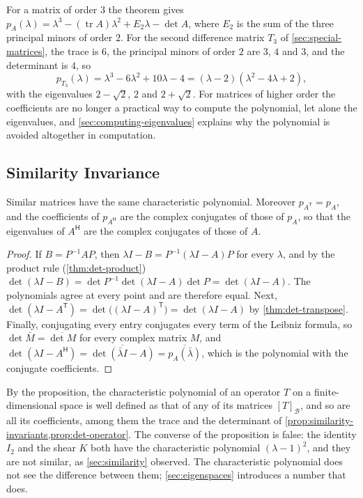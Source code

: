 For a matrix of order $3$ the theorem gives $p_A(\lambda)=\lambda^3-(\operatorname{tr}A)\lambda^2+E_2\lambda-\det A$, where $E_2$ is the sum of the three principal minors of order $2$. For the second difference matrix $T_3$ of \cref{sec:special-matrices}, the trace is $6$, the principal minors of order $2$ are $3$, $4$ and $3$, and the determinant is $4$, so
\[
p_{T_3}(\lambda)=\lambda^3-6\lambda^2+10\lambda-4=(\lambda-2)(\lambda^2-4\lambda+2),
\]
with the eigenvalues $2-\sqrt2$, $2$ and $2+\sqrt2$. For matrices of higher order the coefficients are no longer a practical way to compute the polynomial, let alone the eigenvalues, and \cref{sec:computing-eigenvalues} explains why the polynomial is avoided altogether in computation.

\subsection{Similarity Invariance}

\begin{proposition}
\label{prop:charpoly-similar}
Similar matrices have the same characteristic polynomial. Moreover $p_{A^{\mathsf T}}=p_A$, and the coefficients of $p_{A^{\mathsf H}}$ are the complex conjugates of those of $p_A$, so that the eigenvalues of $A^{\mathsf H}$ are the complex conjugates of those of $A$.
\end{proposition}

\begin{proof}
If $B=P^{-1}AP$, then $\lambda I-B=P^{-1}(\lambda I-A)P$ for every $\lambda$, and by the product rule (\cref{thm:det-product}) $\det(\lambda I-B)=\det P^{-1}\det(\lambda I-A)\det P=\det(\lambda I-A)$. The polynomials agree at every point and are therefore equal. Next, $\det(\lambda I-A^{\mathsf T})=\det\bigl((\lambda I-A)^{\mathsf T}\bigr)=\det(\lambda I-A)$ by \cref{thm:det-transpose}. Finally, conjugating every entry conjugates every term of the Leibniz formula, so $\det\bar M=\overline{\det M}$ for every complex matrix $M$, and $\det(\lambda I-A^{\mathsf H})=\overline{\det(\bar\lambda I-A)}=\overline{p_A(\bar\lambda)}$, which is the polynomial with the conjugate coefficients.
\end{proof}

By the proposition, the characteristic polynomial of an operator $T$ on a finite-dimensional space is well defined as that of any of its matrices $[T]_{\mathcal B}$, and so are all its coefficients, among them the trace and the determinant of \cref{prop:similarity-invariants,prop:det-operator}. The converse of the proposition is false: the identity $I_2$ and the shear $K$ both have the characteristic polynomial $(\lambda-1)^2$, and they are not similar, as \cref{sec:similarity} observed. The characteristic polynomial does not see the difference between them; \cref{sec:eigenspaces} introduces a number that does.

